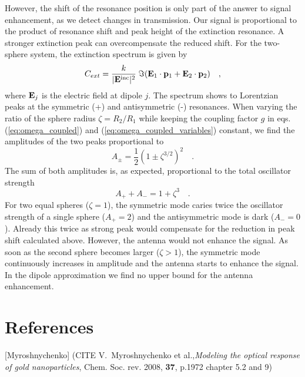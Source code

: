 However, the shift of the resonance position is only part of the answer to
signal enhancement, as we detect changes in transmission. Our signal is
proportional to the product of resonance shift and peak height of the extinction
resonance. A stronger extinction peak can overcompensate the reduced shift. For
the two-sphere system, the extinction spectrum is given by  
%
\begin{equation} 
 C_{ext} =  \frac{k}{|{\bf E}^{\text{inc}}|^2} \; \Im({\bf E}_1 \cdot {\bf p}_1 + {\bf E}_2 \cdot {\bf p}_2) \quad ,
\end{equation}
%
where ${\bf E}_j$ is the electric field at dipole $j$. The spectrum shows to Lorentzian
peaks at the symmetric (+) and antisymmetric (-) resonances.  When varying the ratio of the sphere radius  $\zeta = R_2 / R_1$ while keeping the coupling factor $g$ in eqs. (\ref{eq:omega_coupled}) and (\ref{eq:omega_coupled_variables})
constant, we find the  amplitudes of
the two peaks  proportional to 
%
\begin{equation} 
 A_\pm = \frac{1}{2} \left( 1 \pm \zeta^{3/2} \right)^2 \quad .
\end{equation}
%
The sum of both amplitudes is, as expected, proportional to the total oscillator
strength
%
\begin{equation} 
 A_+ + A_- = 1 + \zeta^3 \quad .
\end{equation}
%
For two equal spheres ($\zeta = 1$), the symmetric mode caries twice the
oscillator strength of a single sphere ($A_+ = 2$) and the antisymmetric mode
is dark ($A_- = 0$). Already this twice as strong peak would compensate for the
reduction in peak shift calculated above. However, the antenna would not
enhance the signal. As soon as the second sphere becomes larger ($\zeta > 1$),
the symmetric mode continuously increases in amplitude and the antenna starts to
enhance the signal. In the dipole approximation we find  no upper bound for the
antenna enhancement.


\section*{References}


[Myroshnychenko] (CITE V.~Myroshnychenko
et al.,\textit{Modeling the optical response of gold nanoparticles}, Chem. Soc.
rev. 2008, \textbf{37}, p.1972 chapter 5.2 and 9)


